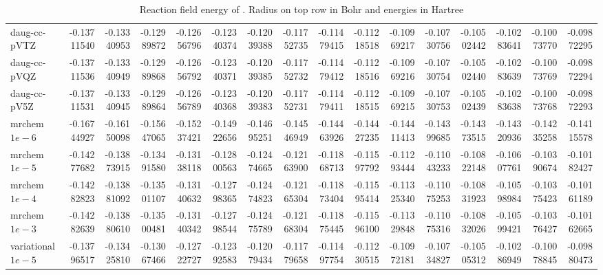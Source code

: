 \documentclass[../Thesis.tex]{subfiles}
\begin{document}
\begin{sidewaystable}
{{\begin{tabular}{l|r|r|r|r|r|r|r|r|r|r|r|r|r|r|r}
daug-cc-pVTZ & -0.13711540 & -0.13340953 & -0.12989872 & -0.12656796 & -0.12340374 & -0.12039388 & -0.11752735 & -0.11479415 & -0.11218518 & -0.10969217 & -0.10730756 & -0.10502442 & -0.10283641 & -0.10073770 & -0.09872295 \\
daug-cc-pVQZ & -0.13711536 & -0.13340949 & -0.12989868 & -0.12656792 & -0.12340371 & -0.12039385 & -0.11752732 & -0.11479412 & -0.11218516 & -0.10969216 & -0.10730754 & -0.10502440 & -0.10283639 & -0.10073769 & -0.09872294 \\
daug-cc-pV5Z & -0.13711531 & -0.13340945 & -0.12989864 & -0.12656789 & -0.12340368 & -0.12039383 & -0.11752731 & -0.11479411 & -0.11218515 & -0.10969215 & -0.10730753 & -0.10502439 & -0.10283638 & -0.10073768 & -0.09872293 \\ \hline
mrchem $1e-6$ & -0.16744927 & -0.16150098 & -0.15647065 & -0.15237421 & -0.14922656 & -0.14695251 & -0.14546949 & -0.14463926 & -0.14427235 & -0.14411413 & -0.14399685 & -0.14373515 & -0.14320936 & -0.14235258 & -0.14115578 \\
mrchem $1e-5$& -0.14277682 & -0.13873915 & -0.13491580 & -0.13138118 & -0.12800563 & -0.12474665 & -0.12163900 & -0.11868713 & -0.11597792 & -0.11293444 & -0.11043233 & -0.10822148 & -0.10607761 & -0.10390674 & -0.10182427 \\
mrchem $1e-4$& -0.14282823 & -0.13881092 & -0.13501107 & -0.13140632 & -0.12798365 & -0.12474823 & -0.12165304 & -0.11873404 & -0.11595414 & -0.11325340 & -0.11075253 & -0.10831923 & -0.10598984 & -0.10375423 & -0.10161189 \\
mrchem $1e-3$& -0.14282639 & -0.13880610 & -0.13500481 & -0.13140342 & -0.12798544 & -0.12475789 & -0.12168304 & -0.11875445 & -0.11596100 & -0.11329848 & -0.11075316 & -0.10832026 & -0.10599421 & -0.10376427 & -0.10162665 \\
variational $1e-5$& -0.13796517 & -0.13425810 & -0.13067466 & -0.12722727 & -0.12392583 & -0.12079434 & -0.11779658 & -0.11497754 & -0.11230515 & -0.10972181 & -0.10734827 & -0.10505312 & -0.10286949 & -0.10078845 & -0.09880473 \\
\end{tabular}}}{\caption{Reaction field energy of . Radius on top row in Bohr and energies in Hartree}
\label{tab:Erdatalip}}
\end{sidewaystable}
\end{document}
